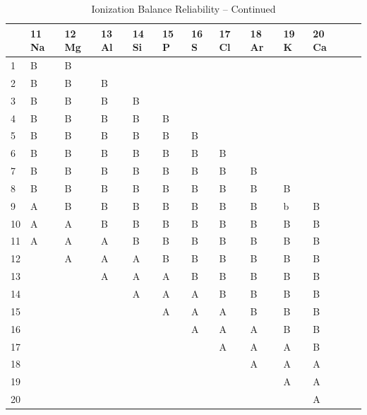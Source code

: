 \begin{table}
\addtocounter{table}{-1}
\begin{center}
\caption{Ionization Balance Reliability -- Continued}
\begin{tabular}{lllllllllllll}
\hline
&11 Na&12 Mg&13 Al&14 Si&15 P&16 S&17 Cl&18 Ar&19 K&20 Ca\\
\hline
1&B&B\\
2&B&B&B\\
3&B&B&B&B\\
4&B&B&B&B&B\\
5&B&B&B&B&B&B\\
6&B&B&B&B&B&B&B\\
7&B&B&B&B&B&B&B&B\\
8&B&B&B&B&B&B&B&B&B\\
9&A&B&B&B&B&B&B&B&b&B\\
10&A&A&B&B&B&B&B&B&B&B\\
11&A&A&A&B&B&B&B&B&B&B\\
12&&A&A&A&B&B&B&B&B&B\\
13&&&A&A&A&B&B&B&B&B\\
14&&&&A&A&A&B&B&B&B\\
15&&&&&A&A&A&B&B&B\\
16&&&&&&A&A&A&B&B\\
17&&&&&&&A&A&A&B\\
18&&&&&&&&A&A&A\\
19&&&&&&&&&A&A\\
20&&&&&&&&&&A\\
\hline
\end{tabular}
\end{center}
\end{table}


